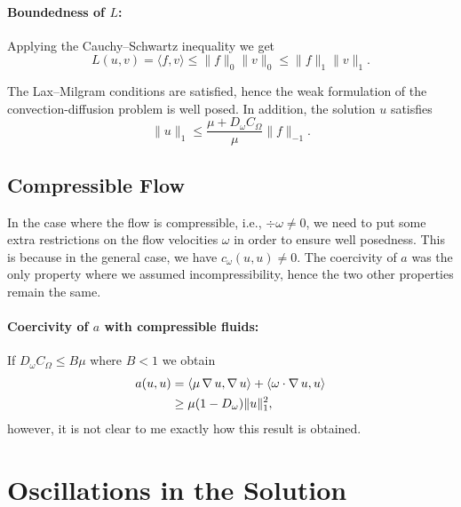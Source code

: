 \paragraph{Boundedness of \( L \):}

Applying the Cauchy--Schwartz inequality we get
\begin{equation}
    L(u, v) = \langle f, v \rangle \leq \| f \|_0 \| v\|_0 \leq \|f\|_1 \|v\|_1.
\end{equation}

The Lax--Milgram conditions are satisfied, hence the weak formulation of the
convection-diffusion problem is well posed. In addition, the solution \( u \)
satisfies
\begin{equation}
    \| u \|_1 \leq \frac{\mu + D_\omega C_\Omega}{\mu}\|f\|_{-1}.
\end{equation}

\subsection{Compressible Flow}
\label{sub:compressible_flow}

In the case where the flow is compressible, i.e., \( \div \omega \neq 0 \), we
need to put some extra restrictions on the flow velocities \( \omega \) in
order to ensure well posedness. This is because in the general case, we have \(
c_\omega(u, u) \neq 0 \). The coercivity of \(a \) was the only property where
we assumed incompressibility, hence the two other properties remain the same.

\paragraph{Coercivity of \(a\) with compressible fluids:}

If \( D_\omega C_\Omega \leq B\mu \) where \( B < 1 \) we obtain
\begin{align}
    a(u, u) &= \langle \mu \operatorname{\mathop{}\!\nabla} u, \operatorname{\mathop{}\!\nabla} u \rangle + \langle \omega \cdot \operatorname{\mathop{}\!\nabla} u, u \rangle \\
            &\geq \mu (1 - D_\omega)\|u\|_1^2,
\end{align}
however, it is not clear to me exactly how this result is obtained.

\section{Oscillations in the Solution}
\label{sec:oscillations_in_the_solution}

